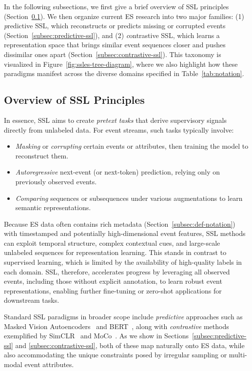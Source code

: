 \documentclass[twoside,11pt]{article}
\begin{document}
In the following subsections, we first give a brief overview of SSL principles (Section~\ref{subsec:ssl-overview}). We then organize current ES research into two major families: (1) {\textit predictive SSL}, which reconstructs or predicts missing or corrupted events (Section~\ref{subsec:predictive-ssl}), and (2) {\textit contrastive SSL}, which learns a representation space that brings similar event sequences closer and pushes dissimilar ones apart (Section~\ref{subsec:contrastive-ssl}). This taxonomy is visualized in Figure~\ref{fig:ssles-tree-diagram}, where we also highlight how these paradigms manifest across the diverse domains specified in Table~\ref{tab:notation}.

\subsection{Overview of SSL Principles}
\label{subsec:ssl-overview}

In essence, SSL aims to create {\it pretext tasks} that derive supervisory signals directly from unlabeled data. For event streams, such tasks typically involve:
\begin{itemize}
\item \emph{Masking} or \emph{corrupting} certain events or attributes, then training the model to reconstruct them.
\item \emph{Autoregressive} next-event (or next-token) prediction, relying only on previously observed events.
\item \emph{Comparing} sequences or subsequences under various augmentations to learn semantic representations.
\end{itemize}

Because ES data often contains rich metadata (Section~\ref{subsec:def-notation}) with timestamped and potentially high-dimensional event features, SSL methods can exploit temporal structure, complex contextual cues, and large-scale unlabeled sequences for representation learning. This stands in contrast to supervised learning, which is limited by the availability of high-quality labels in each domain. SSL, therefore, accelerates progress by leveraging all observed events, including those without explicit annotation, to learn robust event representations, enabling further fine-tuning or zero-shot applications for downstream tasks.

Standard SSL paradigms in broader scope include \emph{predictive} approaches such as Masked Vision Autoencoders~ and BERT~, along with \emph{contrastive} methods exemplified by SimCLR~ and MoCo~. As we show in Sections~\ref{subsec:predictive-ssl} and \ref{subsec:contrastive-ssl}, both of these map naturally onto ES data, while also accommodating the unique constraints posed by irregular sampling or multi-modal event attributes.
\end{document}
